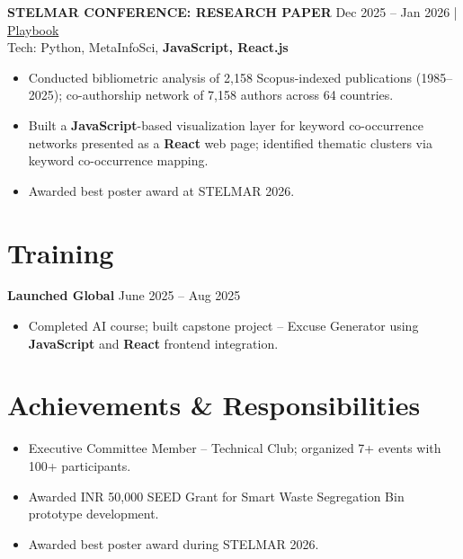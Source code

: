\documentclass[10pt,a4paper]{article}
\begin{document}
\vspace{2pt}\noindent
\textbf{STELMAR CONFERENCE: RESEARCH PAPER} \hfill Dec 2025 -- Jan 2026 | \href{https://drive.google.com/file/d/1b2gHatiAK-U937fmNOLQ1ZwGJNj94b__/view}{Playbook} \\[2pt]
Tech: Python, MetaInfoSci, \textbf{JavaScript, React.js}
\begin{itemize}
    \item Conducted bibliometric analysis of 2,158 Scopus-indexed publications (1985--2025); co-authorship network of 7,158 authors across 64 countries.
    \item Built a \textbf{JavaScript}-based visualization layer for keyword co-occurrence networks presented as a \textbf{React} web page; identified thematic clusters via keyword co-occurrence mapping.
    \item Awarded best poster award at STELMAR 2026.
\end{itemize}

\section*{Training}
\vspace{1pt}
\textbf{Launched Global} \hfill June 2025 -- Aug 2025
\begin{itemize}
    \item Completed AI course; built capstone project -- Excuse Generator using \textbf{JavaScript} and \textbf{React} frontend integration.
\end{itemize}

\section*{Achievements \& Responsibilities}
\vspace{1pt}
\begin{itemize}
    \item Executive Committee Member -- Technical Club; organized 7+ events with 100+ participants.
    \item Awarded INR 50,000 SEED Grant for Smart Waste Segregation Bin prototype development.
    \item Awarded best poster award during STELMAR 2026.
\end{itemize}
\end{document}
